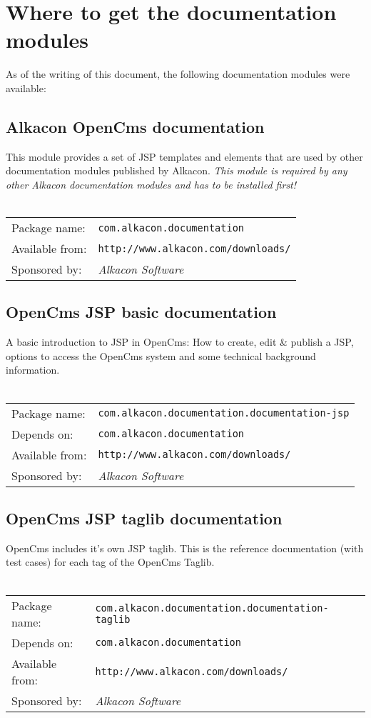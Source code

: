 \section{Where to get the documentation modules}

As of the writing of this document, the following documentation modules were available:

\subsection{Alkacon OpenCms documentation}
This module provides a set of JSP templates and elements that are used by
other documentation modules published by Alkacon. {\em This module is required
by any other Alkacon documentation modules and has to be installed first!}
\\
\\
\begin{tabular}{ll}
Package name: & {\tt com.alkacon.documentation}\\
Available from: & {\tt http://www.alkacon.com/downloads/}\\
Sponsored by: & {\em Alkacon Software}\\
\end{tabular}

\subsection{OpenCms JSP basic documentation}
A basic introduction to JSP in OpenCms: How to create, edit \& publish a JSP, options to access 
the OpenCms system and some technical background information.
\\
\\
\begin{tabular}{ll}
Package name: & {\tt com.alkacon.documentation.documentation-jsp}\\
Depends on: & {\tt com.alkacon.documentation}\\
Available from: & {\tt http://www.alkacon.com/downloads/}\\
Sponsored by: & {\em Alkacon Software}\\
\end{tabular}

\subsection{OpenCms JSP taglib documentation}
OpenCms includes it's own JSP taglib. This is the reference documentation (with test cases) for 
each tag of the OpenCms Taglib.
\\
\\
\begin{tabular}{ll}
Package name: & {\tt com.alkacon.documentation.documentation-taglib}\\
Depends on: & {\tt com.alkacon.documentation}\\
Available from: & {\tt http://www.alkacon.com/downloads/}\\
Sponsored by: & {\em Alkacon Software}\\
\end{tabular}

